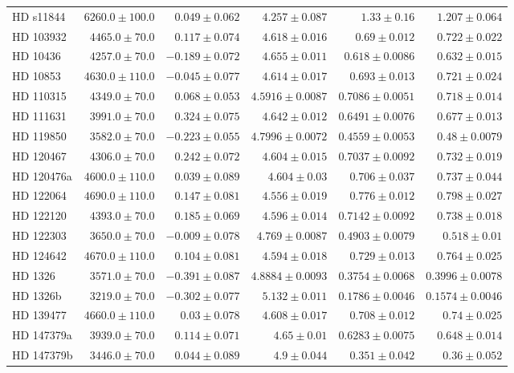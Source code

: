 \begin{longtable*}{lrrrrr}
HD s11844 & $6260.0\pm 100.0$ & $0.049\pm 0.062$ & $4.257\pm 0.087$ & $1.33\pm 0.16$ & $1.207\pm 0.064$ \\ 
HD 103932 & $4465.0\pm 70.0$ & $0.117\pm 0.074$ & $4.618\pm 0.016$ & $0.69\pm 0.012$ & $0.722\pm 0.022$ \\ 
HD 10436 & $4257.0\pm 70.0$ & $-0.189\pm 0.072$ & $4.655\pm 0.011$ & $0.618\pm 0.0086$ & $0.632\pm 0.015$ \\ 
HD 10853 & $4630.0\pm 110.0$ & $-0.045\pm 0.077$ & $4.614\pm 0.017$ & $0.693\pm 0.013$ & $0.721\pm 0.024$ \\ 
HD 110315 & $4349.0\pm 70.0$ & $0.068\pm 0.053$ & $4.5916\pm 0.0087$ & $0.7086\pm 0.0051$ & $0.718\pm 0.014$ \\ 
HD 111631 & $3991.0\pm 70.0$ & $0.324\pm 0.075$ & $4.642\pm 0.012$ & $0.6491\pm 0.0076$ & $0.677\pm 0.013$ \\ 
HD 119850 & $3582.0\pm 70.0$ & $-0.223\pm 0.055$ & $4.7996\pm 0.0072$ & $0.4559\pm 0.0053$ & $0.48\pm 0.0079$ \\ 
HD 120467 & $4306.0\pm 70.0$ & $0.242\pm 0.072$ & $4.604\pm 0.015$ & $0.7037\pm 0.0092$ & $0.732\pm 0.019$ \\ 
HD 120476a & $4600.0\pm 110.0$ & $0.039\pm 0.089$ & $4.604\pm 0.03$ & $0.706\pm 0.037$ & $0.737\pm 0.044$ \\ 
HD 122064 & $4690.0\pm 110.0$ & $0.147\pm 0.081$ & $4.556\pm 0.019$ & $0.776\pm 0.012$ & $0.798\pm 0.027$ \\ 
HD 122120 & $4393.0\pm 70.0$ & $0.185\pm 0.069$ & $4.596\pm 0.014$ & $0.7142\pm 0.0092$ & $0.738\pm 0.018$ \\ 
HD 122303 & $3650.0\pm 70.0$ & $-0.009\pm 0.078$ & $4.769\pm 0.0087$ & $0.4903\pm 0.0079$ & $0.518\pm 0.01$ \\ 
HD 124642 & $4670.0\pm 110.0$ & $0.104\pm 0.081$ & $4.594\pm 0.018$ & $0.729\pm 0.013$ & $0.764\pm 0.025$ \\ 
HD 1326 & $3571.0\pm 70.0$ & $-0.391\pm 0.087$ & $4.8884\pm 0.0093$ & $0.3754\pm 0.0068$ & $0.3996\pm 0.0078$ \\ 
HD 1326b & $3219.0\pm 70.0$ & $-0.302\pm 0.077$ & $5.132\pm 0.011$ & $0.1786\pm 0.0046$ & $0.1574\pm 0.0046$ \\ 
HD 139477 & $4660.0\pm 110.0$ & $0.03\pm 0.078$ & $4.608\pm 0.017$ & $0.708\pm 0.012$ & $0.74\pm 0.025$ \\ 
HD 147379a & $3939.0\pm 70.0$ & $0.114\pm 0.071$ & $4.65\pm 0.01$ & $0.6283\pm 0.0075$ & $0.648\pm 0.014$ \\ 
HD 147379b & $3446.0\pm 70.0$ & $0.044\pm 0.089$ & $4.9\pm 0.044$ & $0.351\pm 0.042$ & $0.36\pm 0.052$ \\ 

\end{longtable*}
